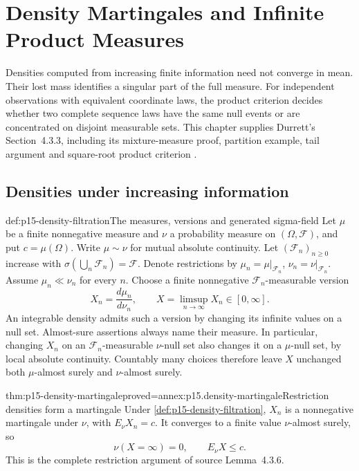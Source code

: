 \chapter{Density Martingales and Infinite Product Measures}
\label{sec:p15-density-martingales}

Densities computed from increasing finite information need not converge
in mean. Their lost mass identifies a singular part of the full measure.
For independent observations with equivalent coordinate laws, the product
criterion decides whether two complete sequence laws have the same null
events or are concentrated on disjoint measurable sets. This chapter supplies
Durrett's Section~4.3.3, including its mixture-measure proof, partition
example, tail argument and square-root product criterion
\cite[pp.~227--230]{DurrettPTEAuthor2019}.

\section{Densities under increasing information}

\begin{hbdefinition}{def:p15-density-filtration}{The measures, versions and generated sigma-field}
Let \(\mu\) be a finite nonnegative measure and \(\nu\) a probability
measure on \((\Omega,\mathcal F)\), and put \(c=\mu(\Omega)\).
Write \(\mu\sim\nu\) for mutual absolute continuity.
Let \((\mathcal F_n)_{n\geq0}\) increase with
\(\sigma(\bigcup_n\mathcal F_n)=\mathcal F\). Denote restrictions by
\(\mu_n=\mu|_{\mathcal F_n}\), \(\nu_n=\nu|_{\mathcal F_n}\).
Assume \(\mu_n\ll\nu_n\) for every \(n\).
Choose a finite nonnegative \(\mathcal F_n\)-measurable version
\[
                 X_n=\frac{d\mu_n}{d\nu_n},
                 \qquad X=\limsup_{n\to\infty}X_n\in[0,\infty].
\]
An integrable density admits such a version by changing its infinite
values on a null set. Almost-sure assertions always name their measure.
In particular, changing \(X_n\) on an \(\mathcal F_n\)-measurable
\(\nu\)-null set also changes it on a \(\mu\)-null set, by local absolute
continuity. Countably many choices therefore leave \(X\) unchanged
both \(\mu\)-almost surely and \(\nu\)-almost surely.
\end{hbdefinition}

\begin{hblemma}{thm:p15-density-martingale}{proved=annex:p15.density-martingale}{Restriction densities form a martingale}
Under \cref{def:p15-density-filtration}, \(X_n\) is a nonnegative
martingale under \(\nu\), with \(E_\nu X_n=c\).
It converges to a finite value \(\nu\)-almost surely, so
\[
                       \nu(X=\infty)=0,\qquad E_\nu X\leq c.
\]
This is the complete restriction argument of source Lemma~4.3.6.
\end{hblemma}

